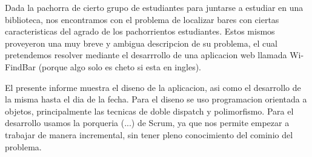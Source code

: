 Dada la pachorra de cierto grupo de estudiantes para juntarse a estudiar en una biblioteca, nos encontramos con el problema de localizar bares con ciertas caracteristicas del 
agrado de los pachorrientos estudiantes. Estos mismos proveyeron una muy breve y ambigua descripcion de su problema, el cual pretendemos resolver mediante el desarrrollo de una 
aplicacion web llamada Wi-FindBar (porque algo solo es cheto si esta en ingles). 

El presente informe muestra el diseno de la aplicacion, asi como el desarrollo de la misma hasta el dia de la fecha. Para el diseno se uso programacion orientada a objetos, 
principalmente las tecnicas de doble dispatch y polimorfismo. Para el desarrollo usamos la porqueria (...) de Scrum, ya que nos permite empezar a trabajar de manera incremental, sin tener
pleno conocimiento del cominio del problema.